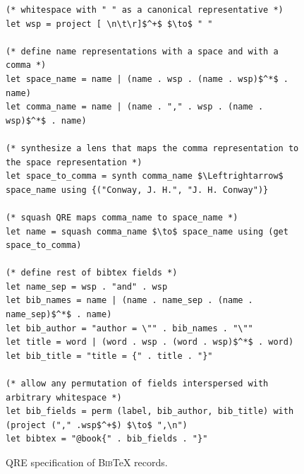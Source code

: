 \documentclass[acmsmall,review,anonymous]{acmart}\settopmatter{printfolios=true,printccs=false,printacmref=false}
\newcommand{\bibtex}{\textsc{Bib}\TeX{}}
\newcommand{\cd}[1]{\lstinline[backgroundcolor=\color{white}]$#1$}
\begin{document}
\begin{figure}[t]
\begin{lstlisting}
(* whitespace with " " as a canonical representative *)
let wsp = project [ \n\t\r]$^+$ $\to$ " "

(* define name representations with a space and with a comma *)
let space_name = name | (name . wsp . (name . wsp)$^*$ . name)
let comma_name = name | (name . "," . wsp . (name . wsp)$^*$ . name)

(* synthesize a lens that maps the comma representation to the space representation *)
let space_to_comma = synth comma_name $\Leftrightarrow$ space_name using {("Conway, J. H.", "J. H. Conway")}

(* squash QRE maps comma_name to space_name *)
let name = squash comma_name $\to$ space_name using (get space_to_comma)

(* define rest of bibtex fields *)
let name_sep = wsp . "and" . wsp
let bib_names = name | (name . name_sep . (name . name_sep)$^*$ . name)
let bib_author = "author = \"" . bib_names . "\""
let title = word | (word . wsp . (word . wsp)$^*$ . word)
let bib_title = "title = {" . title . "}"

(* allow any permutation of fields interspersed with arbitrary whitespace *)
let bib_fields = perm (label, bib_author, bib_title) with (project ("," .wsp$^+$) $\to$ ",\n")
let bibtex = "@book{" . bib_fields . "}"
\end{lstlisting}
\caption{QRE specification of \bibtex{} records. }
\label{fig:example-qre}
\end{figure}




\end{document}
